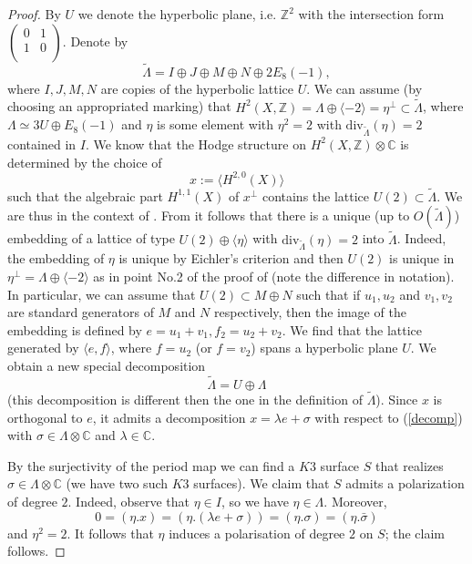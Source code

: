 \documentclass[a4paper,11pt]{amsart}
\theoremstyle{definition}
\numberwithin{equation}{section}
\numberwithin{equation}{section} \theoremstyle{definition}
\begin{document}
\begin{proof}
By $U$ we denote the hyperbolic plane, i.e. ${\mathbb{Z}}^2$ with the intersection form 
$\left( \begin{array}{cc}
0 & 1 \\
1 & 0  \\
\end{array} \right) $.
Denote by $$\tilde{\Lambda}=I\oplus J\oplus M\oplus N \oplus 2E_8(-1),$$ where $I,J,M,N$ are copies of the hyperbolic lattice $U$.
We can assume (by choosing an appropriated marking) that $H^2(X,{\mathbb{Z}})=\Lambda \oplus \langle-2\rangle=\eta^{\perp} \subset \tilde{\Lambda}$, where $\Lambda\simeq 3U\oplus E_8(-1)$ and $\eta$ is some element with $\eta^2=2$ with $\mathrm{div}_{\tilde{\Lambda}}(\eta)=2$ contained in $I$. 
We know that the Hodge structure on $H^2(X,{\mathbb{Z}})\otimes {{\mathbb{C}  }}$ is determined by the choice of  $$x:=\langle H^{2,0}(X)\rangle$$ such that the algebraic part $H^{1,1}(X)$ of $x^{\bot}$ contains the 
lattice $U(2) \subset \tilde{\Lambda}$. We are thus in the context of \cite[Lemma~2.6]{Huy}.
From  \cite{Nik1} it follows that there is a unique (up to $O(\tilde{\Lambda})$) embedding of a lattice of type $U(2)\oplus \langle\eta\rangle$ with $\mathrm{div}_{\tilde{\Lambda}}(\eta)=2$ into $\tilde{\Lambda}$. Indeed, the embedding of $\eta$ is unique  by Eichler's criterion \cite[Proposition 1.7]{OW} and then $U(2)$ is unique in $\eta^{\perp}=\Lambda \oplus \langle-2\rangle$ as in point No.2 of the proof of \cite[Proposition~2.5]{OW} (note the difference in notation). 
In particular, we can assume that $U(2)\subset M\oplus N$ such that if $u_1,u_2$ and $v_1,v_2$ are standard generators of $M$ and $N$ respectively, then the image of the embedding is defined by $e=u_1+v_1, f_2=u_2+v_2$.
We find that the lattice generated by $\langle e,f\rangle$, where $f=u_2$ (or $f=v_2$) spans a hyperbolic plane $U$.
We obtain a new special decomposition \begin{equation}\label{decomp} \tilde{\Lambda}=U\oplus \Lambda\end{equation} 
 (this decomposition is different then the one in the definition of $\tilde{\Lambda}$).
Since $x$ is orthogonal to $e$,  it admits a decomposition $x=\lambda e+\sigma$ with respect to (\ref{decomp})   with $\sigma\in \Lambda \otimes {{\mathbb{C}  }}$ and $\lambda \in {{\mathbb{C}  }}$.

By the surjectivity of the period map we can find a $K3$ surface $S$ that realizes $\sigma\in \Lambda \otimes {{\mathbb{C}  }}$ (we have two such $K3$ surfaces).
We claim that $S$ admits a polarization of degree $2$.
Indeed, observe that $\eta\in I$, so we have $\eta \in \Lambda$. Moreover, $$0=(\eta.x)=(\eta.(\lambda e+\sigma))=(\eta.\sigma)=(\eta.\bar{\sigma})$$ and $\eta^2=2$.
It follows that $\eta$ induces a polarisation of degree $2$ on $S$; the claim follows.


\end{proof}
\end{document}
